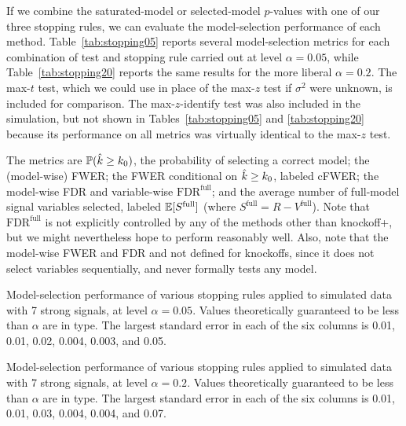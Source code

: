 \documentclass{article}
\begin{document}
If we combine the saturated-model or selected-model $p$-values with one of our three stopping rules, we can evaluate the model-selection performance of each method. Table~\ref{tab:stopping05} reports several model-selection metrics for each combination of test and stopping rule carried out at level $\alpha=0.05$, while Table~\ref{tab:stopping20} reports the same results for the more liberal $\alpha=0.2$. The max-$t$ test, which we could use in place of the max-$z$ test if $\sigma^2$ were unknown, is included for comparison. The max-$z$-identify test was also included in the simulation, but not shown in Tables~\ref{tab:stopping05} and \ref{tab:stopping20} because its performance on all metrics was virtually identical to the max-$z$ test.

The metrics are $\mathbb{P}(\hat{k} \geq k_0)$, the probability of selecting a correct model; the (model-wise) FWER; the FWER conditional on $\hat{k} \geq k_0$, labeled cFWER; the model-wise FDR and variable-wise $\text{FDR}^{\text{full}}$; and the average number of full-model signal variables selected, labeled $\mathbb{E}[S^{\text{full}}]$ (where $S^{\text{full}} = R-V^{\text{full}}$). Note that $\text{FDR}^{\text{full}}$ is not explicitly controlled by any of the methods other than knockoff+, but we might nevertheless hope to perform reasonably well. Also, note that the model-wise FWER and FDR and not defined for knockoffs, since it does not select variables sequentially, and never formally tests any model.

\begin{table}[ht]
\centering

\caption[tab:stopping]{Model-selection performance of various stopping rules applied to simulated data with 7 strong signals,  at level $\alpha=0.05$. Values theoretically guaranteed to be less than $\alpha$ are in  type. The largest standard error in each of the six columns is 0.01, 0.01, 0.02, 0.004, 0.003, and 0.05.}
\label{tab:stopping05}
\end{table}

\begin{table}[ht]
\centering

\caption[tab:stopping]{Model-selection performance of various stopping rules applied to simulated data with 7 strong signals, at level $\alpha=0.2$. Values theoretically guaranteed to be less than $\alpha$ are in  type. The largest standard error in each of the six columns is 0.01, 0.01, 0.03, 0.004, 0.004, and 0.07.}
\label{tab:stopping20}
\end{table}
\end{document}
